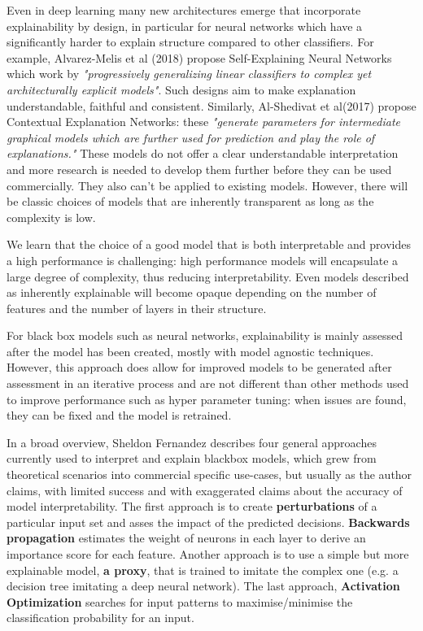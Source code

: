 \documentclass[proposal]{softeng}
\begin{document}
Even in deep learning many new architectures emerge that incorporate explainability by design, in particular for neural networks which have a significantly harder to explain structure compared to other classifiers. For example, Alvarez-Melis et al (2018)\cite{alvarezmelis2018robust} propose Self-Explaining Neural Networks which work by \textit{"progressively generalizing linear classifiers to complex yet architecturally explicit models"}. Such designs aim to make explanation understandable, faithful and consistent. Similarly, Al-Shedivat et al(2017)\cite{alshedivat2017contextual} propose Contextual Explanation Networks: these \textit{"generate parameters for intermediate graphical models which are further used for prediction and play the role of explanations."} These models do not offer a clear understandable interpretation and more research is needed to develop them further before they can be used commercially. They also can't be applied to existing models. However, there will be classic choices of models that are inherently transparent as long as the complexity is low. 

We learn that the choice of a good model that is both interpretable and provides a high performance is challenging: high performance models will encapsulate a large degree of complexity, thus reducing interpretability. Even models described as inherently explainable will become opaque depending on the number of features and the number of layers in their structure. 

For black box models such as neural networks, explainability is mainly assessed after the model has been created, mostly with model agnostic techniques. However, this approach does allow for improved models to be generated after assessment in an iterative process and are not different than other methods used to improve performance such as hyper parameter tuning: when issues are found, they can be fixed and the model is retrained.

In a broad overview, Sheldon Fernandez \cite{fernandez-dark-ai} describes four general approaches currently used to interpret and explain blackbox models, which grew from theoretical scenarios into commercial specific use-cases, but usually as the author claims, with limited success and with exaggerated claims about the accuracy of model interpretability. The first approach is to create \textbf{perturbations} of a particular input set and asses the impact of the predicted decisions. \textbf{Backwards propagation} estimates the weight of neurons in each layer to derive an importance score for each feature. Another approach is to use a simple but more explainable model, \textbf{a proxy}, that is trained to imitate the complex one (e.g. a decision tree imitating a deep neural network). The last approach, \textbf{Activation Optimization} searches for input patterns to maximise/minimise the classification probability for an input.  
\end{document}
